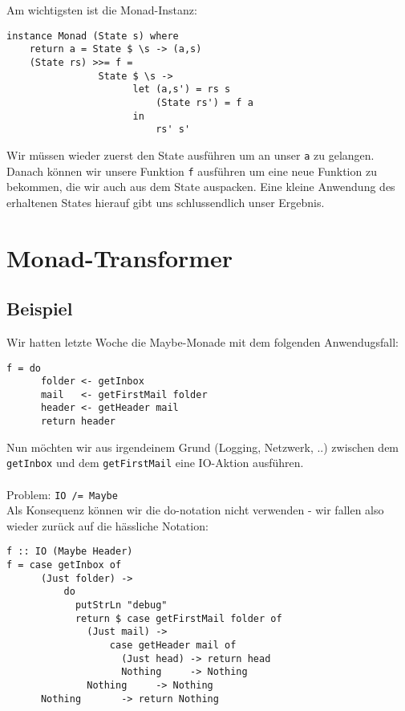 \documentclass{beamer}
\begin{document}
\begin{frame}[fragile]
Am wichtigsten ist die Monad-Instanz:
\begin{verbatim}
instance Monad (State s) where
    return a = State $ \s -> (a,s)
    (State rs) >>= f =
                State $ \s ->
                      let (a,s') = rs s
                          (State rs') = f a
                      in
                          rs' s'
\end{verbatim}
\pause
Wir müssen wieder zuerst den State ausführen um an unser \texttt{a} zu gelangen. Danach können wir unsere Funktion \texttt{f} ausführen um eine neue Funktion zu bekommen, die wir auch aus dem State auspacken. Eine kleine Anwendung des erhaltenen States hierauf gibt uns schlussendlich unser Ergebnis.
\end{frame}

\section{Monad-Transformer}

\subsection{Beispiel}
\begin{frame}[fragile]
Wir hatten letzte Woche die Maybe-Monade mit dem folgenden Anwendugsfall:
\begin{verbatim}
f = do
      folder <- getInbox
      mail   <- getFirstMail folder
      header <- getHeader mail
      return header
\end{verbatim}
Nun möchten wir aus irgendeinem Grund (Logging, Netzwerk, ..) zwischen dem \texttt{getInbox} und dem \texttt{getFirstMail} eine IO-Aktion ausführen.\\
~\\
Problem: \texttt{IO /= Maybe}\\
\pause
Als Konsequenz können wir die do-notation nicht verwenden - wir fallen also wieder zurück auf die hässliche Notation:
\end{frame}

\begin{frame}[fragile]
\begin{verbatim}
f :: IO (Maybe Header)
f = case getInbox of
      (Just folder) -> 
          do
            putStrLn "debug"
            return $ case getFirstMail folder of
              (Just mail) -> 
                  case getHeader mail of
                    (Just head) -> return head
                    Nothing     -> Nothing
              Nothing     -> Nothing
      Nothing       -> return Nothing
\end{verbatim}
\end{frame}
\end{document}
